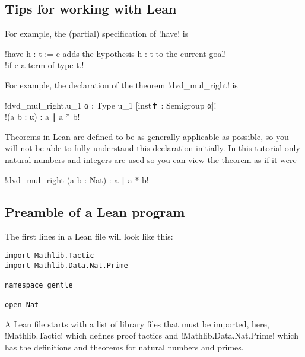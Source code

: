 \subsection*{Tips for working with Lean}



For example, the (partial) specification of !have! is

\indnt{}!have h : t := e adds the hypothesis h : t to the current goal!\\
\indnt{}\indnt{}!if e a term of type t.!


For example, the declaration of the theorem !dvd_mul_right! is

\indnt{}!dvd_mul_right.{u_1} {α : Type u_1} [inst✝ : Semigroup α]!\\
\indnt{}\indnt{}!(a b : α) : a ∣ a * b!

Theorems in Lean are defined to be as generally applicable as possible, so you will not be able to fully understand this declaration initially. In this tutorial only natural numbers and integers are used so you can view the theorem as if it were

\indnt{}!dvd_mul_right (a b : Nat) : a ∣ a * b!


\subsection*{Preamble of a Lean program}

The first lines in a Lean file will look like this:
\begin{Verbatim}
import Mathlib.Tactic
import Mathlib.Data.Nat.Prime

namespace gentle

open Nat
\end{Verbatim}

A Lean file starts with a list of library files that must be imported, here, !Mathlib.Tactic! which defines proof tactics and !Mathlib.Data.Nat.Prime! which has the definitions and theorems for natural numbers and primes.

